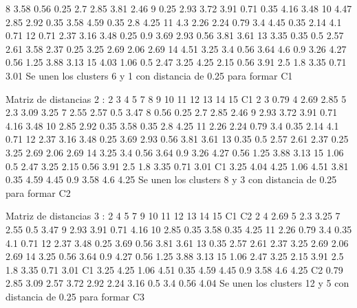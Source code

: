 \documentclass[a4paper, 12pt]{article}
\begin{document}
\begin{itemize}
\begin{Schunk}
\begin{Soutput}
8  3.58 0.56 0.25 2.7  2.85 3.81 2.46                                      
9  0.25 2.93 3.72 3.91 0.71 0.35 4.16 3.48                                 
10 4.47 2.85 2.92 0.35 3.58 4.59 0.35 2.8  4.25                            
11 4.3  2.26 2.24 0.79 3.4  4.45 0.35 2.14 4.1  0.71                       
12 0.71 2.37 3.16 3.48 0.25 0.9  3.69 2.93 0.56 3.81 3.61                  
13 3.35 0.35 0.5  2.57 2.61 3.58 2.37 0.25 3.25 2.69 2.06 2.69             
14 4.51 3.25 3.4  0.56 3.64 4.6  0.9  3.26 4.27 0.56 1.25 3.88 3.13        
15 4.03 1.06 0.5  2.47 3.25 4.25 2.15 0.56 3.91 2.5  1.8  3.35 0.71 3.01   
Se unen los clusters 6 y 1 con distancia de 0.25 para formar C1 

Matriz de distancias 2 :
   2    3    4    5    7    8    9    10   11   12   13   14   15   C1
2                                                                     
3  0.79                                                               
4  2.69 2.85                                                          
5  2.3  3.09 3.25                                                     
7  2.55 2.57 0.5  3.47                                                
8  0.56 0.25 2.7  2.85 2.46                                           
9  2.93 3.72 3.91 0.71 4.16 3.48                                      
10 2.85 2.92 0.35 3.58 0.35 2.8  4.25                                 
11 2.26 2.24 0.79 3.4  0.35 2.14 4.1  0.71                            
12 2.37 3.16 3.48 0.25 3.69 2.93 0.56 3.81 3.61                       
13 0.35 0.5  2.57 2.61 2.37 0.25 3.25 2.69 2.06 2.69                  
14 3.25 3.4  0.56 3.64 0.9  3.26 4.27 0.56 1.25 3.88 3.13             
15 1.06 0.5  2.47 3.25 2.15 0.56 3.91 2.5  1.8  3.35 0.71 3.01        
C1 3.25 4.04 4.25 1.06 4.51 3.81 0.35 4.59 4.45 0.9  3.58 4.6  4.25   
Se unen los clusters 8 y 3 con distancia de 0.25 para formar C2 

Matriz de distancias 3 :
   2    4    5    7    9    10   11   12   13   14   15   C1   C2
2                                                                
4  2.69                                                          
5  2.3  3.25                                                     
7  2.55 0.5  3.47                                                
9  2.93 3.91 0.71 4.16                                           
10 2.85 0.35 3.58 0.35 4.25                                      
11 2.26 0.79 3.4  0.35 4.1  0.71                                 
12 2.37 3.48 0.25 3.69 0.56 3.81 3.61                            
13 0.35 2.57 2.61 2.37 3.25 2.69 2.06 2.69                       
14 3.25 0.56 3.64 0.9  4.27 0.56 1.25 3.88 3.13                  
15 1.06 2.47 3.25 2.15 3.91 2.5  1.8  3.35 0.71 3.01             
C1 3.25 4.25 1.06 4.51 0.35 4.59 4.45 0.9  3.58 4.6  4.25        
C2 0.79 2.85 3.09 2.57 3.72 2.92 2.24 3.16 0.5  3.4  0.56 4.04   
Se unen los clusters 12 y 5 con distancia de 0.25 para formar C3 


\end{Soutput}
\end{Schunk}
\end{itemize}
\end{document}
